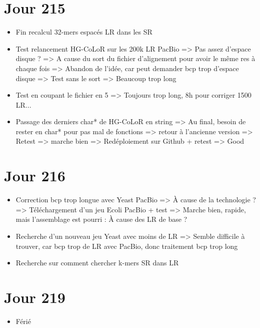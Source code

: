 \documentclass[12pt]{report}
\begin{document}
\section{Jour 215}

\begin{itemize}
	\item Fin recalcul 32-mers espacés LR dans les SR
	
	\item Test relancement HG-CoLoR sur les 200k LR PacBio => Pas assez d'espace disque ?
		  => A cause du sort du fichier d'alignement pour avoir le même res à chaque fois
		  => Abandon de l'idée, car peut demander bcp trop d'espace disque
		  => Test sans le sort
		  => Beaucoup trop long
		  
	\item Test en coupant le fichier en 5 => Toujours trop long, 8h pour corriger 1500 LR...
	
	\item Passage des derniers char* de HG-CoLoR en string => Au final, besoin de rester en char* pour
		  pas mal de fonctions => retour à l'ancienne version
		  => Retest => marche bien
		  => Redéploiement sur Github + retest => Good
\end{itemize}

\section{Jour 216}

\begin{itemize}
	\item Correction bcp trop longue avec Yeast PacBio => À cause de la technologie ?
			=> Téléchargement d'un jeu Ecoli PacBio + test
			=> Marche bien, rapide, mais l'assemblage est pourri : À cause des LR de base ?

	\item Recherche d'un nouveau jeu Yeast avec moins de LR => Semble difficile à trouver,
		  car bcp trop de LR avec PacBio, donc traitement bcp trop long
	
	\item Recherche sur comment chercher k-mers SR dans LR
\end{itemize}

\section{Jour 219}

\begin{itemize}
	\item Férié
\end{itemize}
\end{document}
